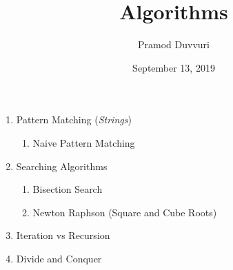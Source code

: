 \documentclass[11pt]{article}
\title{Algorithms}
\author{Pramod Duvvuri}
\date{September 13, 2019}
\begin{document}
	\maketitle
	\begin{enumerate} 
		\item Pattern Matching (\textit{Strings})
		\begin{enumerate}
			\item Naive Pattern Matching
		\end{enumerate}
	    \item Searching Algorithms
	    \begin{enumerate}
	    	\item Bisection Search
	    	\item Newton Raphson (Square and Cube Roots)
	    \end{enumerate}
          \item Iteration vs Recursion
          \item Divide and Conquer
	\end{enumerate}
\end{document}
